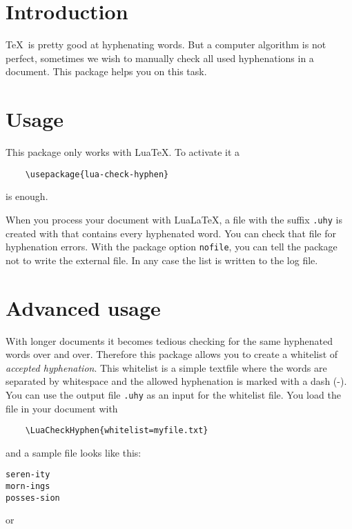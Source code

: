 \documentclass{ltxdockit}
\begin{document}
\printtitlepage
\tableofcontents

\section{Introduction}

\TeX\ is pretty good at hyphenating words. But a computer algorithm is not perfect, sometimes we wish to manually check all used hyphenations in a document. This package helps you on this task.

\section{Usage}

This package only works with Lua\TeX. To activate it a

\begin{verbatim}
	\usepackage{lua-check-hyphen}
\end{verbatim}
is enough.

When you process your document with Lua\LaTeX, a file with the suffix \verb|.uhy| is created with that contains every hyphenated word. You can check that file for hyphenation errors. With the package option \texttt{nofile}, you can tell the package not to write the external file. In any case the list is written to the log file.

\section{Advanced usage}
\label{sec:advanced_usage}

With longer documents it becomes tedious checking for the same hyphenated words over and over. Therefore this package allows you to create a whitelist of \emph{accepted hyphenation}. This whitelist is a simple textfile where the words are separated by whitespace and the allowed hyphenation is marked with a dash (-). You can use the output file \texttt{.uhy} as an input for the whitelist file. You load the file in your document with

\begin{verbatim}
	\LuaCheckHyphen{whitelist=myfile.txt}
\end{verbatim}

and a sample file looks like this:

\begin{verbatim}
seren-ity
morn-ings
posses-sion
\end{verbatim}

or
\end{document}

